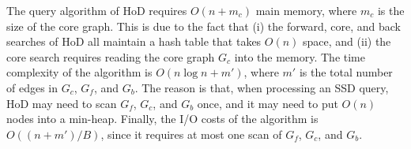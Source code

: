 \documentclass{sig-alternate}
\def\GC{G_c}
\def\GF{G_f}
\def\GB{G_b}
\begin{document}
\begin{sloppy}


The query algorithm of HoD requires $O(n + m_c)$ main memory, where $m_c$ is the size of the core graph. This is due to the fact that (i) the forward, core, and back searches of HoD all maintain a hash table that takes $O(n)$ space, and (ii) the core search requires reading the core graph $\GC$ into the memory. The time complexity of the algorithm is $O(n \log n + m')$, where $m'$ is the total number of edges in $\GC$, $\GF$, and $\GB$. The reason is that, when processing an SSD query, HoD may need to scan $\GF$, $\GC$, and $\GB$ once, and it may need to put $O(n)$ nodes into a min-heap. Finally, the I/O costs of the algorithm is $O((n + m')/B)$, since it requires at most one scan of $\GF$, $\GC$, and $\GB$.





\end{sloppy}
\end{document}
